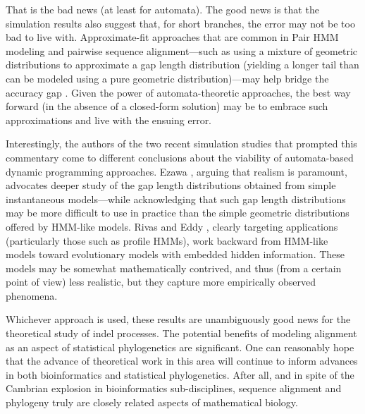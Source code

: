 \documentclass{bmcart}
\begin{document}
That is the bad news (at least for automata).
The good news is that the simulation results also suggest that,
for short branches, the error may not be too bad to live with.
Approximate-fit approaches that are common in Pair HMM modeling and pairwise sequence alignment---such as using a mixture
of geometric distributions to approximate a gap length distribution (yielding a longer tail than can be modeled
using a pure geometric distribution)---may help bridge the accuracy gap \cite{DoEtAl2005}.
Given the power of automata-theoretic approaches, the best way forward
(in the absence of a closed-form solution) may be to embrace such approximations and live with the ensuing error.

Interestingly, the authors of the two recent simulation studies that prompted this commentary
come to different conclusions about the viability of automata-based dynamic programming approaches.
Ezawa \cite{Ezawa2016a,Ezawa2016b}, arguing that realism is paramount, advocates deeper study of the
gap length distributions obtained from simple instantaneous models---while acknowledging that such gap length distributions
may be more difficult to use in practice than the simple geometric distributions offered by HMM-like models.
Rivas and Eddy \cite{RivasEddy2015}, clearly targeting applications (particularly those such as profile HMMs),
work backward from HMM-like models toward evolutionary models with embedded
hidden information.
These models may be somewhat mathematically contrived, and thus (from a certain point of view) less realistic,
but they capture more empirically observed phenomena.

Whichever approach is used, these results are unambiguously good news for the theoretical study of indel processes.
The potential benefits of modeling alignment as an aspect of statistical phylogenetics are significant.
One can reasonably hope that the advance of theoretical work in this area 
will continue to inform advances in both bioinformatics and statistical phylogenetics.
After all, and in spite of the Cambrian explosion in bioinformatics sub-disciplines,
sequence alignment and phylogeny truly are closely related aspects of mathematical biology.



\end{document}

